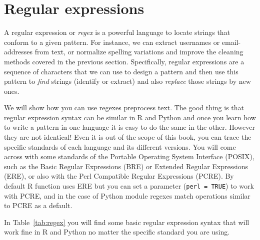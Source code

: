 \section{Regular expressions}
\label{sec:regular}

A regular expression or \emph{regex} is a powerful language to locate strings that conform to a given pattern. For instance, we can extract usernames or email-addresses from text, or normalize spelling variations and improve the cleaning methods covered in the previous section. Specifically, regular expressions are a sequence of characters that we can use to design a pattern and then use this pattern to \emph{find} strings (identify or extract) and also \emph{replace} those strings by new ones. 

We will show how you can use regexes preprocess text. The good thing is that regular expression syntax can be similar in R and Python and once you learn how to write a pattern in one language it is easy to do the same in the other.  However they are not identical! Even it is out of the scope of this book, you can trace the specific standards of each language and its different versions. You will come across with some standards of the Portable Operating System Interface (POSIX), such as the Basic Regular Expressions (BRE) or Extended Regular Expressions (ERE), or also with the Perl Compatible Regular Expressions (PCRE).  By default R function  uses ERE but you can set a parameter (\verb|perl = TRUE|) to work with PCRE, and in the case of Python  module regexes match operations similar to PCRE as a default.

In Table~\ref{tab:regex} you will find some basic regular expression syntax that will work fine in R and Python no matter the specific standard you are using.


\newcommand{\bs}[1]{\texttt{\textbackslash#1}}

